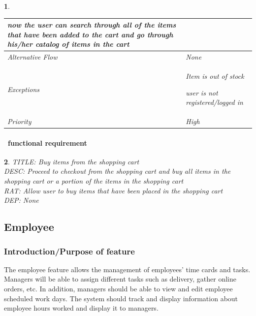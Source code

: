 \documentclass{scrreprt}
\theoremstyle{funreq}
\newtheorem{funreq}{}
\begin{document}
\begin{funreq}
\begin{table}[H]
{\begin{tabularx}{\columnwidth}{|l|X|}
					now the user can search through all of the items that have been added to the cart and go through his/her catalog of items in the cart \\ \hline
					Alternative Flow & None                                       \\ \hline
					Exceptions       & Item is out of stock
					
					user is not registered/logged in \\ \hline
					Priority         & High                                       \\ \hline
				\end{tabularx}%
			}
		\end{table}
	\end{funreq}

	
	\paragraph[]{\Subsectionname ~functional requirement }
	\begin{funreq}
		\label{card_buy}
		TITLE: Buy items from the shopping cart\\
		DESC: Proceed to checkout from the shopping cart and buy all items in the shopping cart or a portion of the items in the shopping cart\\
		RAT: Allow user to buy items that have been placed in the shopping cart\\
		DEP: None
	\end{funreq}
	
	
	\subsection{Employee}
	\subsubsection{Introduction/Purpose of feature}
	The employee feature allows the management of employees’ time cards and tasks. Managers will be able to assign different tasks such as delivery, gather online orders, etc.  In addition, managers should be able to view and edit employee scheduled work days.  The system should track and display information about employee hours worked and display it to managers.
	
\end{document}
